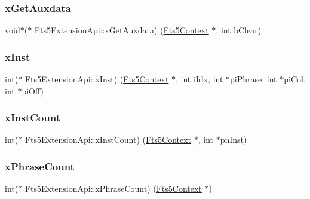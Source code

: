\subsubsection{\texorpdfstring{xGetAuxdata}{xGetAuxdata}}
{\footnotesize\ttfamily void$\ast$($\ast$ Fts5\+Extension\+Api\+::x\+Get\+Auxdata) (\mbox{\hyperlink{sqlite3_8h_a97821b95ebebd43db901977ffd5b26bc}{Fts5\+Context}} $\ast$, int b\+Clear)}

\mbox{\label{struct_fts5_extension_api_a85e17f20db782b20b503f1d803a47a9e}} 
\subsubsection{\texorpdfstring{xInst}{xInst}}
{\footnotesize\ttfamily int($\ast$ Fts5\+Extension\+Api\+::x\+Inst) (\mbox{\hyperlink{sqlite3_8h_a97821b95ebebd43db901977ffd5b26bc}{Fts5\+Context}} $\ast$, int i\+Idx, int $\ast$pi\+Phrase, int $\ast$pi\+Col, int $\ast$pi\+Off)}

\mbox{\label{struct_fts5_extension_api_af57aff7a8aa8402bb37a77892c4daf45}} 
\subsubsection{\texorpdfstring{xInstCount}{xInstCount}}
{\footnotesize\ttfamily int($\ast$ Fts5\+Extension\+Api\+::x\+Inst\+Count) (\mbox{\hyperlink{sqlite3_8h_a97821b95ebebd43db901977ffd5b26bc}{Fts5\+Context}} $\ast$, int $\ast$pn\+Inst)}

\mbox{\label{struct_fts5_extension_api_a3ba0207080a9ca498625eefcc120bf1e}} 
\subsubsection{\texorpdfstring{xPhraseCount}{xPhraseCount}}
{\footnotesize\ttfamily int($\ast$ Fts5\+Extension\+Api\+::x\+Phrase\+Count) (\mbox{\hyperlink{sqlite3_8h_a97821b95ebebd43db901977ffd5b26bc}{Fts5\+Context}} $\ast$)}

